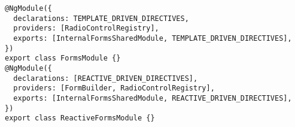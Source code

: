 \begin{verbatim}
@NgModule({
  declarations: TEMPLATE_DRIVEN_DIRECTIVES,
  providers: [RadioControlRegistry],
  exports: [InternalFormsSharedModule, TEMPLATE_DRIVEN_DIRECTIVES],
})
export class FormsModule {}
@NgModule({
  declarations: [REACTIVE_DRIVEN_DIRECTIVES],
  providers: [FormBuilder, RadioControlRegistry],
  exports: [InternalFormsSharedModule, REACTIVE_DRIVEN_DIRECTIVES],
})
export class ReactiveFormsModule {}
\end{verbatim}
